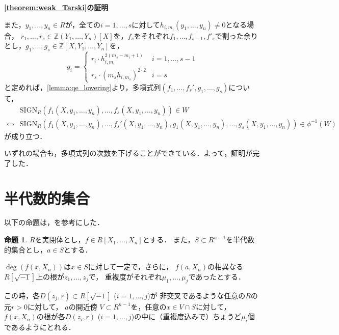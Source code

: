 \documentclass[uplatex, dvipdfmx]{jsarticle}
\makeatletter
\numberwithin{equation}{section}
\renewenvironment{proof}[1][\proofname]{\par
  \pushQED{\qed}%
  \normalfont \topsep6\p@\@plus6\p@\relax
  \trivlist
  \item\relax
  {\bfseries
  #1\@addpunct{.}}\hspace\labelsep\ignorespaces
}{
  \popQED\endtrivlist\@endpefalse
}
\newcommand{\Z}{\mathbb{Z}}
\newcommand{\SIGN}{\mathrm{SIGN}}
\theoremstyle{definition}
\newtheorem{proposition}[definition]{命題}
\renewcommand{\proofname}{\textbf{証明}}
\makeatother
\begin{document}
\begin{proof}[\cref{theorem:weak_Tarski}の証明]
     また，$y_1, \dots, y_n \in R$が，全ての$i=1, \dots, s$に対して$h_{i, m_i}(y_1, \dots, y_n) \neq 0$となる場合，
     $r_1, \dots, r_s \in \Z(Y_1, \dots, Y_n)[X]$を，$f_s$をそれぞれ$f_1, \dots, f_{s-1}, f'_s$で割った余りとし，$g_1, \dots, g_s \in \Z[X,Y_1, \dots, Y_n]$を，
     \begin{equation}
          g_i = \begin{cases}
               r_i \cdot h_{i,m_i}^{2(m_s-m_i+1)} & i=1, \dots, s-1\\
               r_s \cdot (m_s h_{i,m_s})^{2\cdot2} & i=s
          \end{cases}
     \end{equation}
     と定めれば，\cref{lemma:qe_lowering}より，多項式列$(f_1, \dots, f_s', g_1, \dots, g_s)$について，
     \begin{align}
          &\SIGN_R(f_1(X,y_1, \dots, y_n), \dots, f_s(X,y_1, \dots, y_n)) \in W\\
          \iff &\SIGN_R(f_1(X,y_1, \dots, y_n), \dots, f_s'(X,y_1, \dots, y_n),g_1(X,y_1, \dots, y_n), \dots, g_s(X,y_1, \dots, y_n)) \in \phi^{-1}(W)
     \end{align}
     が成り立つ．

     いずれの場合も，多項式列の次数を下げることができている．よって，証明が完了した．
\end{proof}

\section{半代数的集合}

以下の命題は，\cite[Theorem 5.12.]{MR2248869}を参考にした．

\begin{proposition} \label{proposition:continuity-of-roots}
     $R$を実閉体とし，$f \in R[X_1, \dots, X_n]$とする．
     また，$S \subset R^{n-1}$を半代数的集合とし，$a \in S$とする．

     $\deg (f(x,X_n))$は$x \in S$に対して一定で，さらに，
     $f(a,X_n)$の相異なる$R\left[\sqrt{-1} \right]$上の根が$z_1, \dots, z_j$で，
     重複度がそれぞれ$\mu_1, \dots, \mu_j$であったとする．

     この時，各$D(z_j, r) \subset R\left[ \sqrt{-1} \right]$ ($i=1, \dots, j$)が
     非交叉であるような任意の$R$の元$r > 0$に対して，
     $a$の開近傍 $V \subset R^{n-1}$を，任意の$x \in V \cap S$に対して，
     $f(x, X_n)$の根が各$D(z_i, r)$ ($i=1, \dots, j$)の中に（重複度込みで）ちょうど$\mu_i$個であるようにとれる．

\end{proposition}
\end{document}
